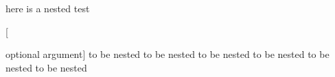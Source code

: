 here is a nested test
\begin{one}


	[

		optional argument]
	to be nested to be nested
	to be nested to be nested
	to be nested to be nested
\end{one}
